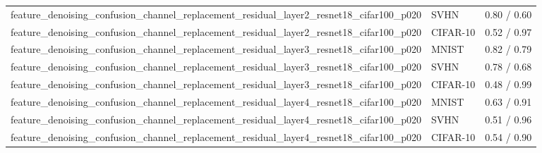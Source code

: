 \begin{tabular}{lll}
feature\_denoising\_confusion\_channel\_replacement\_residual\_layer2\_resnet18\_cifar100\_p020 & SVHN & 0.80 / 0.60 \\
feature\_denoising\_confusion\_channel\_replacement\_residual\_layer2\_resnet18\_cifar100\_p020 & CIFAR-10 & 0.52 / 0.97 \\
feature\_denoising\_confusion\_channel\_replacement\_residual\_layer3\_resnet18\_cifar100\_p020 & MNIST & 0.82 / 0.79 \\
feature\_denoising\_confusion\_channel\_replacement\_residual\_layer3\_resnet18\_cifar100\_p020 & SVHN & 0.78 / 0.68 \\
feature\_denoising\_confusion\_channel\_replacement\_residual\_layer3\_resnet18\_cifar100\_p020 & CIFAR-10 & 0.48 / 0.99 \\
feature\_denoising\_confusion\_channel\_replacement\_residual\_layer4\_resnet18\_cifar100\_p020 & MNIST & 0.63 / 0.91 \\
feature\_denoising\_confusion\_channel\_replacement\_residual\_layer4\_resnet18\_cifar100\_p020 & SVHN & 0.51 / 0.96 \\
feature\_denoising\_confusion\_channel\_replacement\_residual\_layer4\_resnet18\_cifar100\_p020 & CIFAR-10 & 0.54 / 0.90 \\
\bottomrule
\end{tabular}
